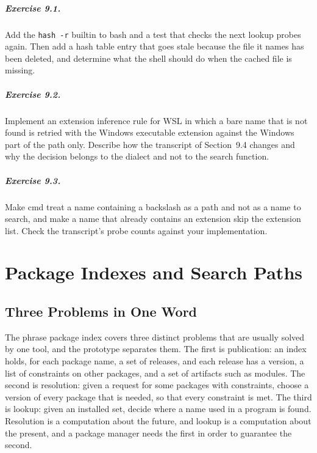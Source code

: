 \paragraph{Exercise 9.1.} Add the \texttt{hash -r} builtin to bash and a test that checks the next lookup probes again. Then add a hash table entry that goes stale because the file it names has been deleted, and determine what the shell should do when the cached file is missing.

\paragraph{Exercise 9.2.} Implement an extension inference rule for WSL in which a bare name that is not found is retried with the Windows executable extension against the Windows part of the path only. Describe how the transcript of Section~9.4 changes and why the decision belongs to the dialect and not to the search function.

\paragraph{Exercise 9.3.} Make cmd treat a name containing a backslash as a path and not as a name to search, and make a name that already contains an extension skip the extension list. Check the transcript's probe counts against your implementation.

\chapter{Package Indexes and Search Paths}

\section{Three Problems in One Word}

The phrase package index covers three distinct problems \cite{cox19} that are usually solved by one tool, and the prototype separates them. The first is publication: an index holds, for each package name, a set of releases, and each release has a version, a list of constraints on other packages, and a set of artifacts such as modules. The second is resolution: given a request for some packages with constraints, choose a version of every package that is needed, so that every constraint is met. The third is lookup: given an installed set, decide where a name used in a program is found. Resolution is a computation about the future, and lookup is a computation about the present, and a package manager needs the first in order to guarantee the second.

